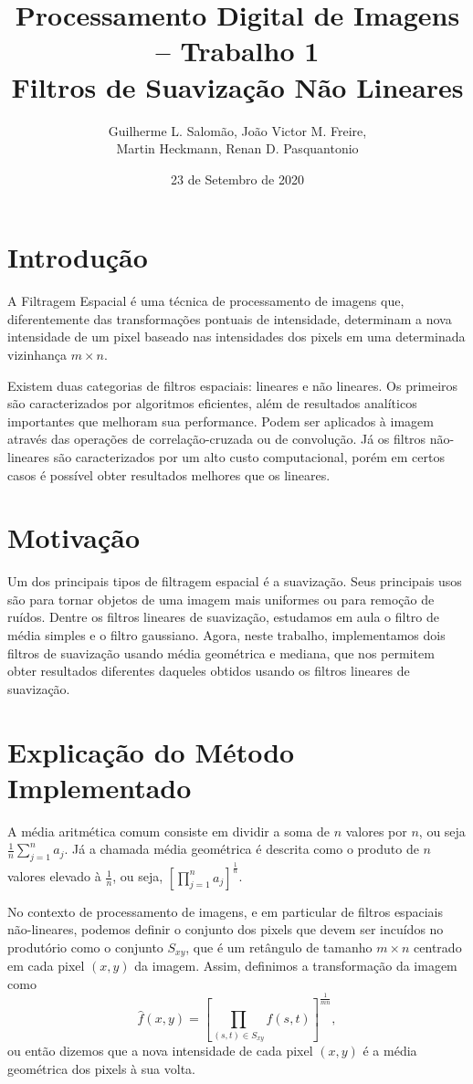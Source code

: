\documentclass[12pt,a4paper]{article}
\title{Processamento Digital de Imagens – Trabalho 1\\Filtros de Suavização Não Lineares}
\author{Guilherme L. Salomão, João Victor M. Freire, \\Martin Heckmann, Renan D. Pasquantonio }
\date{23 de Setembro de 2020}
\begin{document}
\maketitle

\section{Introdução}

    A Filtragem Espacial é uma técnica de processamento de imagens que, diferentemente das transformações pontuais de intensidade, determinam a nova intensidade de um pixel baseado nas intensidades dos pixels em uma determinada vizinhança $m \times n$.
    
    Existem duas categorias de filtros espaciais: lineares e não lineares. Os primeiros são caracterizados por algoritmos eficientes, além de resultados analíticos importantes que melhoram sua performance. Podem ser aplicados à imagem através das operações de correlação-cruzada ou de convolução. Já os filtros não-lineares são caracterizados por um alto custo computacional, porém em certos casos é possível obter resultados melhores que os lineares.

\section{Motivação}
Um dos principais tipos de filtragem espacial é a suavização. Seus principais usos são para tornar objetos de uma imagem mais uniformes ou para remoção de ruídos. Dentre os filtros lineares de suavização, estudamos em aula o filtro de média simples e o filtro gaussiano. Agora, neste trabalho, implementamos dois filtros de suavização usando média geométrica e mediana, que nos permitem obter resultados diferentes daqueles obtidos usando os filtros lineares de suavização.

\section{Explicação do Método Implementado}

A média aritmética comum consiste em dividir a soma de $n$ valores por $n$, ou seja $\frac{1}{n}\sum_{j=1}^{n} a_j$. Já a chamada média geométrica é descrita como o produto de $n$ valores elevado à $\frac{1}{n}$, ou seja, $[\prod_{j=1}^{n} a_j]^{\frac{1}{n}}$.

No contexto de processamento de imagens, e em particular de filtros espaciais não-lineares, podemos definir o conjunto dos pixels que devem ser incuídos no produtório como o conjunto $S_{xy}$, que é um retângulo de tamanho $m \times n$ centrado em cada pixel $(x,y)$ da imagem. Assim, definimos a transformação da imagem como $$\hat{f}(x, y) = [\prod _{(s,t) \in S_{xy}} f(s,t)]^{\frac{1}{mn}},$$ ou então dizemos que a nova intensidade de cada pixel $(x, y)$ é a média geométrica dos pixels à sua volta.
\end{document}
